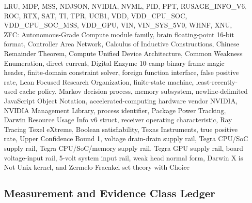 \documentclass[10pt,letterpaper]{article}
\begin{document}
\begin{itemize}
  LRU, MDP, MSS, NDJSON, NVIDIA, NVML, PID, PPT, RUSAGE\_INFO\_V6, ROC,
  RTX, SAT, TI, TPR, UCB1, VDD, VDD\_CPU\_SOC, VDD\_CPU\_SOC\_MSS,
  VDD\_GPU, VIN, VIN\_SYS\_5V0, WHNF, XNU, ZFC: Autonomous-Grade Compute
  module family, brain floating-point 16-bit format, Controller Area
  Network, Calculus of Inductive Constructions, Chinese Remainder
  Theorem, Compute Unified Device Architecture, Common Weakness
  Enumeration, direct current, Digital Enzyme 10-camp binary frame magic
  header, finite-domain constraint solver, foreign function interface,
  false positive rate, Lean Focused Research Organization, finite-state
  machine, least-recently-used cache policy, Markov decision process,
  memory subsystem, newline-delimited JavaScript Object Notation,
  accelerated-computing hardware vendor NVIDIA, NVIDIA Management
  Library, process identifier, Package Power Tracking, Darwin Resource
  Usage Info v6 struct, receiver operating characteristic, Ray Tracing
  Texel eXtreme, Boolean satisfiability, Texas Instruments, true
  positive rate, Upper Confidence Bound 1, voltage drain-drain supply
  rail, Tegra CPU/SoC supply rail, Tegra CPU/SoC/memory supply rail,
  Tegra GPU supply rail, board voltage-input rail, 5-volt system input
  rail, weak head normal form, Darwin X is Not Unix kernel, and
  Zermelo-Fraenkel set theory with Choice
\end{itemize}

\subsection{Measurement and Evidence Class
Ledger}\label{measurement-and-evidence-class-ledger}
\end{document}
